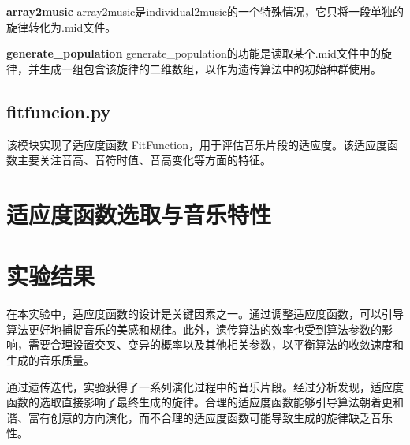 \documentclass{article}
\begin{document}
\textbf{array2music}
\quad array2music是individual2music的一个特殊情况，它只将一段单独的旋律转化为.mid文件。

\textbf{generate\_population}
\quad generate\_population的功能是读取某个.mid文件中的旋律，并生成一组包含该旋律的二维数组，以作为遗传算法中的初始种群使用。

\subsection{fitfuncion.py}
该模块实现了适应度函数 FitFunction，用于评估音乐片段的适应度。该适应度函数主要关注音高、音符时值、音高变化等方面的特征。



\section{适应度函数选取与音乐特性}



\section{实验结果}
在本实验中，适应度函数的设计是关键因素之一。通过调整适应度函数，可以引导算法更好地捕捉音乐的美感和规律。此外，遗传算法的效率也受到算法参数的影响，需要合理设置交叉、变异的概率以及其他相关参数，以平衡算法的收敛速度和生成的音乐质量。


通过遗传迭代，实验获得了一系列演化过程中的音乐片段。经过分析发现，适应度函数的选取直接影响了最终生成的旋律。合理的适应度函数能够引导算法朝着更和谐、富有创意的方向演化，而不合理的适应度函数可能导致生成的旋律缺乏音乐性。
\end{document}
